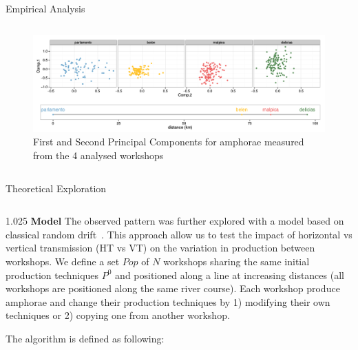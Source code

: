 \documentclass[final]{beamer}
\newlength{\onecolwid}
\newlength{\twocolwid}
\begin{document}
\begin{frame}[t]
\begin{columns}[t]
\begin{column}{\twocolwid}
\begin{block}{Empirical Analysis}
\begin{columns}[t,totalwidth=\twocolwid]
\begin{column}{\twocolwid} %
\begin{figure}
\includegraphics[width=0.6\linewidth]{images/fig2.png}
\singlespace
\caption{First and Second Principal Components for amphorae measured from the 4 analysed workshops}
\label{fig:pca}
\end{figure}
\end{column}
\end{columns}
\end{block}
\vspace{-1cm}
\begin{block}{Theoretical Exploration}

\begin{columns}[t,totalwidth=\twocolwid]

\begin{column}{1.025\onecolwid} %
{\textbf{Model }}
\justify
The observed pattern was further explored with a model based on classical random drift~\cite{bentley2004randomdriftandculturechange}. This approach allow us to test the impact of horizontal vs vertical transmission (HT vs VT) on the variation in production between workshops.  
We define a set $Pop$ of $N$ workshops sharing the same initial production techniques $P^{0}$ and positioned along a line at increasing distances (all workshops are positioned along the same river course).
Each workshop produce amphorae and change their production techniques by 1) modifying their own techniques or 2) copying one from another workshop.

The algorithm is defined as following:   


\begin{center}
\end{center}
\end{column}
\end{columns}
\end{block}
\end{column}
\end{columns}
\end{frame}
\end{document}
